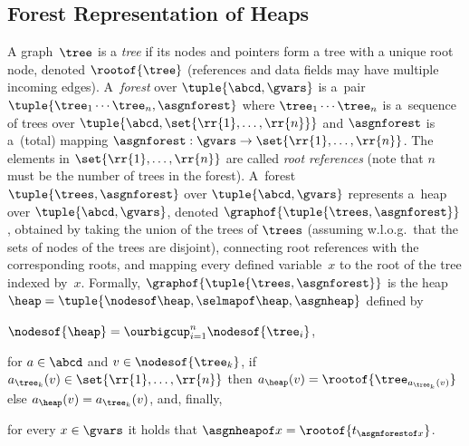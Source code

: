 \subsection*{Forest Representation of Heaps}

A graph~$\tree$ is a \emph{tree} if its nodes and pointers form a tree with a unique root node, denoted
$\rootof{\tree}$ (references and data fields may have multiple incoming edges).
A~\emph{forest} over $\tuple{\abcd, \gvars}$ is a~pair
$\tuple{\tree_1\cdots\tree_n, \asgnforest}$ where  $\tree_1\cdots\tree_n$ is
a~sequence of trees over
$\tuple{\abcd,\set{\rr{1}, \ldots , \rr{n}}}$
and $\asgnforest$ is a~(total) mapping $\asgnforest: \gvars \to \set{\rr{1}, \ldots , \rr{n}}$.
The elements in $\set{\rr{1}, \ldots , \rr{n}}$ are called
\emph{root references} (note that $n$ must be the number of trees in the
forest). 
%
%
A~forest $\tuple{\trees, \asgnforest}$ over
$\tuple{\abcd, \gvars}$ represents a~heap over $\tuple{\abcd, \gvars }$,
denoted $\graphof{\tuple{\trees, \asgnforest}}$, obtained by taking the union of the trees of
$\trees$ (assuming w.l.o.g.\ that the sets of nodes of the trees are disjoint),
connecting root references with the corresponding roots, and mapping every
defined variable~$x$ to the root of the tree indexed by~$x$.
Formally,
$\graphof{\tuple{\trees, \asgnforest}}$ is the heap $\heap = \tuple{\nodesof \heap,
\selmapof \heap, \asgnheap}$ defined by
%
\begin{inparaenum}[(i)]
  \item $\nodesof{\heap} = \ourbigcup_{i=1}^n \nodesof{\tree_i}$,
  \item for $a \in \abcd$ and $v\in\nodesof{\tree_k}$, if $a_{\tree_k}(v) \in
    \set{\rr{1}, \ldots , \rr{n}}$ then $a_{\heap}(v) =
    \rootof{\tree_{a_{\tree_k}(v)}}$ else $a_{\heap}(v) = a_{\tree_k}(v)$, and,
    finally,
  \item for every $x \in \gvars$ it holds that $\asgnheapof x
    = \rootof{t_{\asgnforestof x}}$.
\end{inparaenum} 
